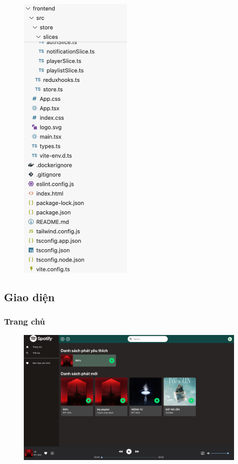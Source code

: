 \documentclass[a4paper]{article}
\begin{document}
\begin{figure}[h!]
\begin{center}
\includegraphics[width=5.5cm]{frontend_folder_3.png}
\end{center}
\end{figure}
\newpage

\subsection{Giao diện}
\newpage
\subsubsection{Trang chủ}

\begin{figure}[h!]
\begin{center}
\includegraphics[width=12cm]{home.png}
\end{center}
\end{figure}
\end{document}
